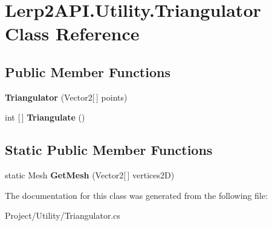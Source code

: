 \hypertarget{class_lerp2_a_p_i_1_1_utility_1_1_triangulator}{}\section{Lerp2\+A\+P\+I.\+Utility.\+Triangulator Class Reference}
\label{class_lerp2_a_p_i_1_1_utility_1_1_triangulator}
\subsection*{Public Member Functions}
\begin{DoxyCompactItemize}
\item 
\mbox{\label{class_lerp2_a_p_i_1_1_utility_1_1_triangulator_ac9456e6e7b64cb7755e9d543508bb1b0}} 
{\bfseries Triangulator} (Vector2\mbox{[}$\,$\mbox{]} points)
\item 
\mbox{\label{class_lerp2_a_p_i_1_1_utility_1_1_triangulator_a88b04de93434765b8d2326f1bd180a08}} 
int \mbox{[}$\,$\mbox{]} {\bfseries Triangulate} ()
\end{DoxyCompactItemize}
\subsection*{Static Public Member Functions}
\begin{DoxyCompactItemize}
\item 
\mbox{\label{class_lerp2_a_p_i_1_1_utility_1_1_triangulator_a26d50740cfb15d2532c7f44878b72218}} 
static Mesh {\bfseries Get\+Mesh} (Vector2\mbox{[}$\,$\mbox{]} vertices2D)
\end{DoxyCompactItemize}


The documentation for this class was generated from the following file\+:\begin{DoxyCompactItemize}
\item 
Project/\+Utility/Triangulator.\+cs\end{DoxyCompactItemize}
